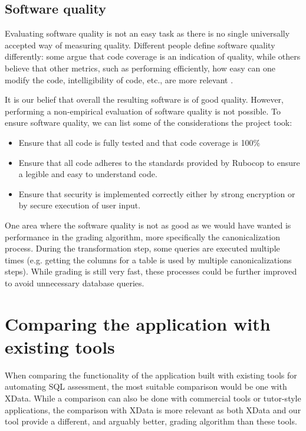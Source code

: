 \subsection{Software quality}

Evaluating software quality is not an easy task as there is no single universally accepted way of measuring quality. Different people define software quality differently: some argue that code coverage is an indication of quality, while others believe that other metrics, such as performing efficiently, how easy can one modify the code, intelligibility of code, etc., are more relevant \citep{msft_testing, Boehm:1976:QES:800253.807736}.

It is our belief that overall the resulting software is of good quality. However, performing a non-empirical evaluation of software quality is not possible. To ensure software quality, we can list some of the considerations the project took:
\begin{itemize}
    \item Ensure that all code is fully tested and that code coverage is 100\%
    \item Ensure that all code adheres to the standards provided by Rubocop to ensure a legible and easy to understand code.
    \item Ensure that security is implemented correctly either by strong encryption or by secure execution of user input.
\end{itemize}

One area where the software quality is not as good as we would have wanted is performance in the grading algorithm, more specifically the canonicalization process. During the transformation step, some queries are executed multiple times (e.g. getting the columns for a table is used by multiple canonicalizations steps). While grading is still very fast, these processes could be further improved to avoid unnecessary database queries.

\section{Comparing the application with existing tools}

When comparing the functionality of the application built with existing tools for automating SQL assessment, the most suitable comparison would be one with XData. While a comparison can also be done with commercial tools or tutor-style applications, the comparison with XData is more relevant as both XData and our tool provide a different, and arguably better, grading algorithm than these tools.


